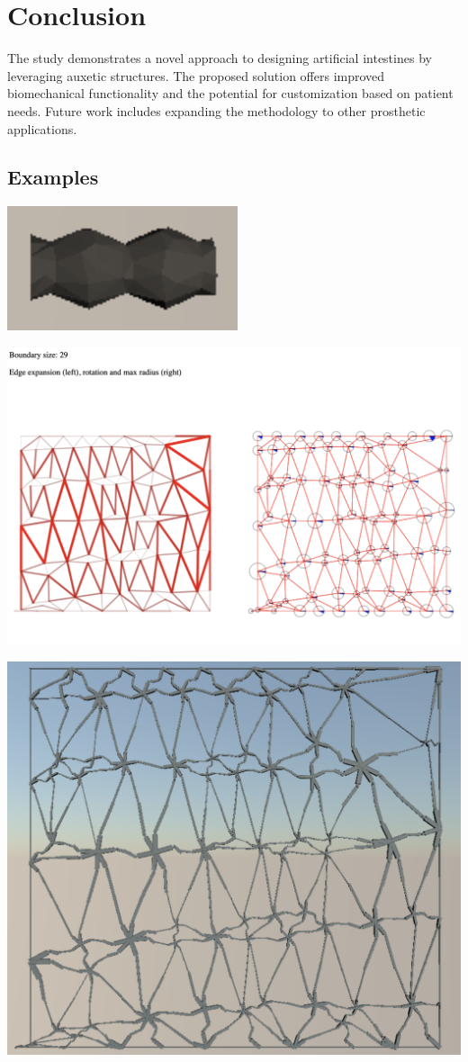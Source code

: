 \documentclass{article}
\begin{document}
\section{Conclusion}
The study demonstrates a novel approach to designing artificial intestines by
leveraging auxetic structures. The proposed solution offers improved biomechanical functionality and the potential for customization based on patient
needs. Future work includes expanding the methodology to other prosthetic
applications.

\subsection{Examples}

\includegraphics[scale=1.2]{example3.png}

\includegraphics[scale=0.18]{example2.png}

\includegraphics[scale=0.18]{example0.png}
\end{document}
